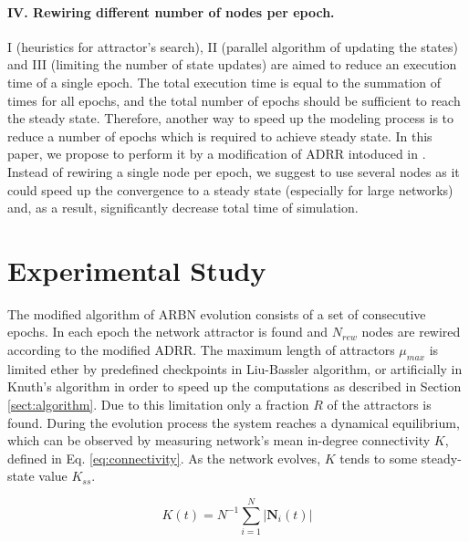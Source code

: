 \documentclass[procedia]{easychair}
\begin{document}
	\paragraph{IV. Rewiring different number of nodes per epoch.} I (heuristics for attractor's search), II (parallel algorithm of updating the states) and III (limiting the number of state updates) are aimed to reduce an execution time of a single epoch. The total execution time is equal to the summation of times for all epochs, and the total number of epochs should be sufficient to reach the steady state. Therefore, another way to speed up the modeling process is to reduce a number of epochs which is required to achieve steady state. In this paper, we propose to perform it by a modification of ADRR intoduced in \cite{mlb}. Instead of rewiring a single node per epoch, we suggest to use several nodes as it could speed up the convergence to a steady state (especially for large networks) and, as a result, significantly decrease total time of simulation.
	

	
	\section{Experimental Study}
	\label{sect:experimental-study}
	
	The modified algorithm of ARBN evolution consists of a set of consecutive epochs. In each epoch the network attractor is found and $N_{rew}$ nodes are rewired according to the modified ADRR. The maximum length of attractors $\mu_{max}$ is limited ether by predefined checkpoints in Liu-Bassler algorithm, or artificially in Knuth's algorithm in order to speed up the computations as described in Section \ref{sect:algorithm}. Due to this limitation only a fraction $R$ of the attractors is found. During the evolution process the system reaches a dynamical equilibrium, which can be observed by measuring network's mean in-degree connectivity $K$, defined in Eq. \ref{eq:connectivity}. As the network evolves, $K$ tends to some steady-state value $K_{ss}$.
	
	
	\begin{equation}
	\label{eq:connectivity}
		K(t) = N^{-1} \sum_{i=1}^{N} {|\mathbf{N}_i(t)|}
	\end{equation}
	
\end{document}

